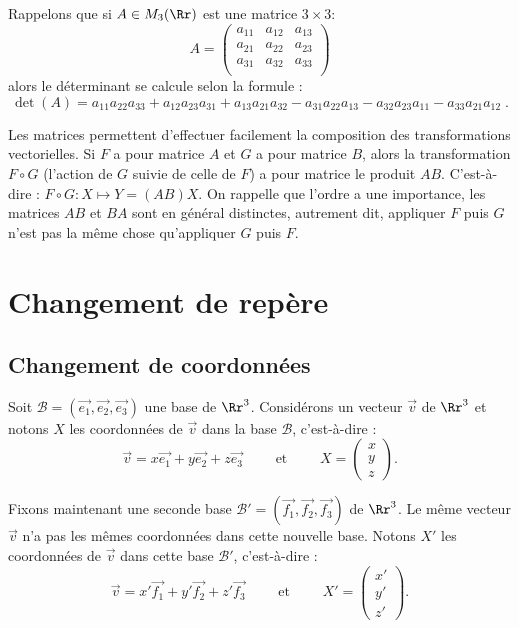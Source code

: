 \documentclass[11pt,class=report,crop=false]{standalone}
\begin{document}
Rappelons que si $A \in M_3(\Rr)$ est une matrice $3 \times 3$:
$$A = \begin{pmatrix}
      a_{11} & a_{12} & a_{13} \\
      a_{21} & a_{22} & a_{23} \\
      a_{31} & a_{32} & a_{33} \\
      \end{pmatrix}$$
alors le déterminant se calcule selon la formule :
$$\det(A) =
a_{11} a_{22} a_{33}
+ a_{12} a_{23} a_{31}
+ a_{13} a_{21} a_{32}
- a_{31} a_{22} a_{13}
- a_{32} a_{23} a_{11}
- a_{33} a_{21} a_{12}\; .$$

Les matrices permettent d'effectuer facilement la composition des transformations vectorielles.
Si $F$ a pour matrice $A$ et $G$ a pour matrice $B$, alors la transformation $F \circ G$ (l'action de $G$ suivie de celle de $F$) a pour matrice le produit $AB$. C'est-à-dire : $F \circ G : X \mapsto Y = (AB)X$.
On rappelle que l'ordre a une importance, les matrices $AB$ et $BA$ sont en général distinctes, autrement dit, appliquer $F$ puis $G$ n'est pas la même chose qu'appliquer $G$ puis $F$. 


\section{Changement de repère}

\subsection{Changement de coordonnées}
\label{ssec:chgtcoord}


Soit $\mathcal{B} = (\vec{e_1}, \vec{e_2}, \vec{e_3})$ une base de $\Rr^3$.
Considérons un vecteur $\vec v$ de $\Rr^3$ et notons $X$ les coordonnées de $\vec v$ dans la base $\mathcal{B}$, c'est-à-dire :
$$
\vec v = x \vec{e_1} + y \vec{e_2} + z \vec{e_3} \qquad \text{ et } \qquad 
X = \begin{pmatrix}x\\y\\z\end{pmatrix}.$$

Fixons maintenant une seconde base $\mathcal{B}' = (\vec{f_1}, \vec{f_2}, \vec{f_3})$ de $\Rr^3$. 
Le même vecteur $\vec v$ n'a pas les mêmes coordonnées dans cette nouvelle base.
Notons $X'$ les coordonnées de $\vec v$ dans cette base $\mathcal{B}'$, c'est-à-dire :
$$
\vec v = x' \vec{f_1} + y' \vec{f_2} + z' \vec{f_3} \qquad \text{ et } \qquad 
X' = \begin{pmatrix}x'\\y'\\z'\end{pmatrix}.$$
\end{document}

